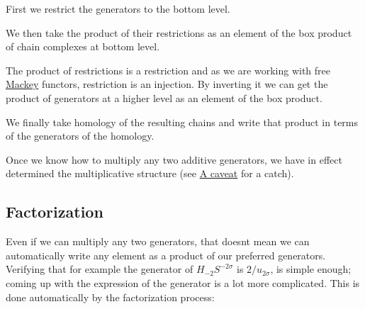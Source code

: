 \begin{DoxyItemize}
\item First we restrict the generators to the bottom level.
\item We then take the product of their restrictions as an element of the box product of chain complexes at bottom level.
\item The product of restrictions is a restriction and as we are working with free \hyperlink{namespaceMackey}{Mackey} functors, restriction is an injection. By inverting it we can get the product of generators at a higher level as an element of the box product.
\item We finally take homology of the resulting chains and write that product in terms of the generators of the homology.
\end{DoxyItemize}

Once we know how to multiply any two additive generators, we have in effect determined the multiplicative structure (see \hyperlink{math_caveat}{A caveat} for a catch).\hypertarget{math_factor}{}\subsection{Factorization}\label{math_factor}
Even if we can multiply any two generators, that doesn\textquotesingle{}t mean we can automatically write any element as a product of our preferred generators. Verifying that for example the generator of $H_{-2}S^{-2\sigma}$ is $2/u_{2\sigma}$, is simple enough; coming up with the expression of the generator is a lot more complicated. This is done automatically by the factorization process\+:


